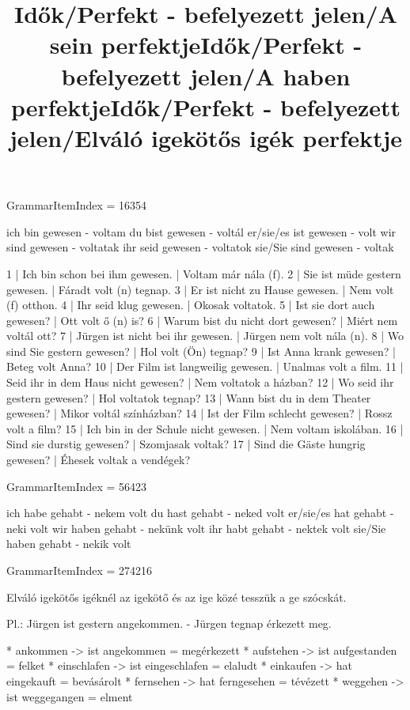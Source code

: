 \title{Idők/Perfekt - befelyezett jelen/A sein perfektje}

GrammarItemIndex = 16354

\begin{desc}
ich bin gewesen - voltam
du bist gewesen - voltál
er/sie/es ist gewesen - volt
wir sind gewesen - voltatak
ihr seid gewesen - voltatok
sie/Sie sind gewesen - voltak
\end{desc}

\begin{exmp}
1 | Ich bin schon bei ihm gewesen. | Voltam már nála (f).
2 | Sie ist müde gestern gewesen. | Fáradt volt (n) tegnap.
3 | Er ist nicht zu Hause gewesen. | Nem volt (f) otthon.
4 | Ihr seid klug gewesen. | Okosak voltatok.
5 | Ist sie dort auch gewesen? | Ott volt ő (n) is?
6 | Warum bist du nicht dort gewesen? | Miért nem voltál ott?
7 | Jürgen ist nicht bei ihr gewesen. | Jürgen nem volt nála (n).
8 | Wo sind Sie gestern gewesen? | Hol volt (Ön) tegnap?
9 | Ist Anna krank gewesen? | Beteg volt Anna?
10 | Der Film ist langweilig gewesen. | Unalmas volt a film.
11 | Seid ihr in dem Haus nicht gewesen? | Nem voltatok a házban?
12 | Wo seid ihr gestern gewesen? | Hol voltatok tegnap?
13 | Wann bist du in dem Theater gewesen? | Mikor voltál színházban?
14 | Ist der Film schlecht gewesen? | Rossz volt a film?
15 | Ich bin in der Schule nicht gewesen. | Nem voltam iskolában.
16 | Sind sie durstig gewesen? | Szomjasak voltak?
17 | Sind die Gäste hungrig gewesen? | Éhesek voltak a vendégek?
\end{exmp}

\title{Idők/Perfekt - befelyezett jelen/A haben perfektje}

GrammarItemIndex = 56423

\begin{desc}

ich habe gehabt - nekem volt
du hast gehabt - neked volt
er/sie/es hat gehabt - neki volt
wir haben gehabt - nekünk volt
ihr habt gehabt - nektek volt
sie/Sie haben gehabt - nekik volt

\end{desc}

\begin{exmp}
\end{exmp}

\title{Idők/Perfekt - befelyezett jelen/Elváló igekötős igék perfektje}

GrammarItemIndex = 274216

\begin{desc}
Elváló igekötős igéknél az igekötő és az ige közé tesszük a ge szócskát.

Pl.: Jürgen ist gestern angekommen. - Jürgen tegnap érkezett meg.

* ankommen -> ist angekommen = megérkezett
* aufstehen -> ist aufgestanden = felket
* einschlafen -> ist eingeschlafen = elaludt
* einkaufen -> hat eingekauft = bevásárolt
* fernsehen -> hat ferngesehen = tévézett
* weggehen -> ist weggegangen = elment
\end{desc}

